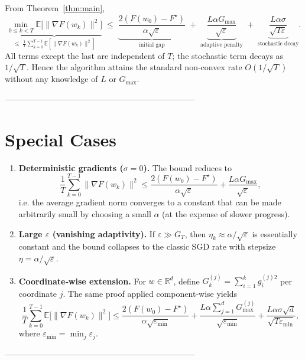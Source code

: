 \documentclass{article}
\newcommand{\E}{\mathbb{E}}
\newcommand{\R}{\mathbb{R}}
\begin{document}
From Theorem~\ref{thm:main},
\[
\underbrace{\min_{0\le k<T}\E\!\big[\|\nabla F(w_k)\|^{2}\big]}_{\displaystyle\le\;\frac{1}{T}\sum_{k=0}^{T-1}\E[\|\nabla F(w_k)\|^{2}]}
\;\le\;
\underbrace{\frac{2(F(w_0)-F^\star)}{\alpha\sqrt{\varepsilon}}}_{\text{initial gap}}
\;+\;
\underbrace{\frac{L\alpha G_{\max}}{\sqrt{\varepsilon}}}_{\text{adaptive penalty}}
\;+\;
\underbrace{\frac{L\alpha\sigma}{\sqrt{T\varepsilon}}}_{\text{stochastic decay}} .
\]
All terms except the last are independent of $T$; the stochastic term decays as $1/\sqrt{T}$.  Hence the algorithm attains the standard non‑convex rate $O(1/\sqrt{T})$ without any knowledge of $L$ or $G_{\max}$.

---------------------------------------------------------------------

\section*{Special Cases}

\begin{enumerate}[label=(\alph*)]
\item \textbf{Deterministic gradients ($\sigma=0$).}  
The bound reduces to
\[
\frac{1}{T}\sum_{k=0}^{T-1}\|\nabla F(w_k)\|^{2}
\le
\frac{2(F(w_0)-F^\star)}{\alpha\sqrt{\varepsilon}}
+\frac{L\alpha G_{\max}}{\sqrt{\varepsilon}},
\]
i.e. the average gradient norm converges to a constant that can be made arbitrarily small by choosing a small $\alpha$ (at the expense of slower progress).

\item \textbf{Large $\varepsilon$ (vanishing adaptivity).}  
If $\varepsilon\gg G_T$, then $\eta_k\approx\alpha/\sqrt{\varepsilon}$ is essentially constant and the bound collapses to the classic SGD rate with stepsize $\eta=\alpha/\sqrt{\varepsilon}$.

\item \textbf{Coordinate‑wise extension.}  
For $w\in\R^{d}$, define $G_k^{(j)}=\sum_{i=1}^{k} g_i^{(j)2}$ per coordinate $j$.  The same proof applied component‑wise yields
\[
\frac{1}{T}\sum_{k=0}^{T-1}\E\!\big[\|\nabla F(w_k)\|^{2}\big]
\le
\frac{2(F(w_0)-F^\star)}{\alpha\sqrt{\varepsilon_{\min}}}
+ \frac{L\alpha\sum_{j=1}^{d}G_{\max}^{(j)}}{\sqrt{\varepsilon_{\min}}}
+ \frac{L\alpha\sigma\sqrt{d}}{\sqrt{T\varepsilon_{\min}}},
\]
where $\varepsilon_{\min}=\min_j\varepsilon_j$.
\end{enumerate}

---------------------------------------------------------------------
\end{document}
